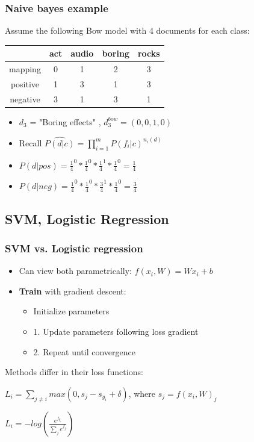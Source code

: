 \documentclass{beamer}
\begin{document}
\begin{frame}
	\frametitle{Naive bayes example}
	Assume the following Bow model with 4 documents for each class:
	\begin{center}
		\begin{table}
			\begin{tabular}{c|c|c|c|c}
				& act & audio & boring & rocks \\ \hline \hline
				mapping & 0 & 1 & 2 & 3 \\ \hline
				positive & 1 & 3 & 1 & 3 \\
				negative & 3 & 1 & 3 & 1
			\end{tabular}
		\end{table}
	\end{center}
	\pause
	\begin{itemize}
		\item $d_3$ = "Boring effects" , $d_3^{bow}=(0,0,1,0)$ \pause
		\item Recall $\widehat{P(d|c)}=\prod_{i=1}^{m}P(f_i|c)^{n_i(d)}$ \pause
		\item $P(d|pos)=\frac{1}{4}^0*\frac{1}{4}^0*\frac{1}{4}^1*\frac{1}{4}^0=\frac{1}{4}$ \pause
		\item $P(d|neg)=\frac{1}{4}^0*\frac{1}{4}^0*\frac{3}{4}^1*\frac{1}{4}^0=\frac{3}{4}$
	\end{itemize}
\end{frame}

\subsection{SVM, Logistic Regression}
\begin{frame}
	\frametitle{SVM vs. Logistic regression}
	\begin{itemize}
		\item Can view both parametrically: $ f(x_i,W) = Wx_i + b $
		\item \textbf{Train} with gradient descent:
		\begin{itemize}
			\item Initialize parameters
			\item 1. Update parameters following loss gradient
			\item 2. Repeat until convergence
		\end{itemize}
	\end{itemize}
	\pause
	Methods differ in their loss functions:
	\begin{definition}
		$ L_i = \sum_{j \neq i}max(0, s_{j} - s_{y_{i}} + \delta)$, where $s_j = f(x_i,W)_j$
	\end{definition}
	
	\begin{definition}
		$ L_i = -log( \frac{ e^{f_{y_{i}}}  }{ \sum_{j} e^{f_{j}} }  ) $
	\end{definition}

\end{frame}
\end{document}

